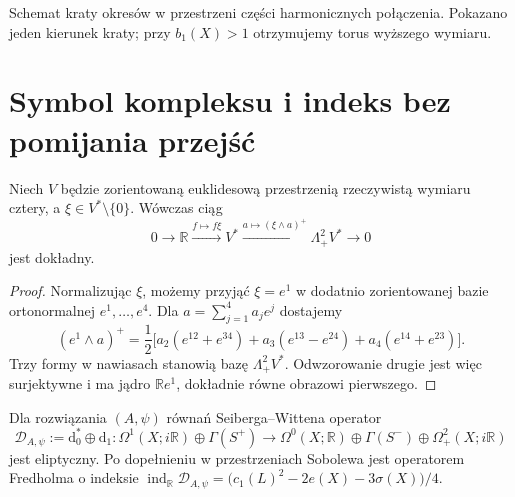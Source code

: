 \begin{center}

{\footnotesize Schemat kraty okresów w przestrzeni części harmonicznych
połączenia. Pokazano jeden kierunek kraty; przy $b_1(X)>1$
otrzymujemy torus wyższego wymiaru.}
\end{center}

\section{Symbol kompleksu i indeks bez pomijania przejść}
\label{sec:tg-sw12-symbol}

\begin{lemat}
\label{lem:tg-sw12-symbol}
Niech $V$ będzie zorientowaną euklidesową przestrzenią
rzeczywistą wymiaru cztery, a $\xi\in V^*\setminus\{0\}$.
Wówczas ciąg
\[
0\longrightarrow\mathbb R
\xrightarrow{f\mapsto f\xi}V^*
\xrightarrow{a\mapsto(\xi\wedge a)^+}\Lambda^2_+V^*
\longrightarrow0
\]
jest dokładny.
\end{lemat}

\begin{proof}
Normalizując $\xi$, możemy przyjąć $\xi=e^1$ w dodatnio
zorientowanej bazie ortonormalnej $e^1,\dots,e^4$.
Dla $a=\sum_{j=1}^4a_je^j$ dostajemy
\[
(e^1\wedge a)^+=\frac12\bigl[
 a_2(e^{12}+e^{34})+a_3(e^{13}-e^{24})
 +a_4(e^{14}+e^{23})\bigr].
\]
Trzy formy w nawiasach stanowią bazę $\Lambda^2_+V^*$.
Odwzorowanie drugie jest więc surjektywne i ma jądro
$\mathbb Re^1$, dokładnie równe obrazowi pierwszego.
\end{proof}

\begin{twierdzenie}
\label{thm:tg-sw12-fredholm}
Dla rozwiązania $(A,\psi)$ równań Seiberga--Wittena operator
\[
\mathcal D_{A,\psi}:=\mathrm d_0^*\oplus\mathrm d_1:
\Omega^1(X;i\mathbb R)\oplus\Gamma(S^+)
\longrightarrow
\Omega^0(X;\mathbb R)\oplus\Gamma(S^-)
\oplus\Omega^2_+(X;i\mathbb R)
\]
jest eliptyczny. Po dopełnieniu w przestrzeniach Sobolewa
jest operatorem Fredholma o indeksie
$\operatorname{ind}_\mathbb R\mathcal D_{A,\psi}
=\bigl(c_1(L)^2-2e(X)-3\sigma(X)\bigr)/4$.
\end{twierdzenie}

